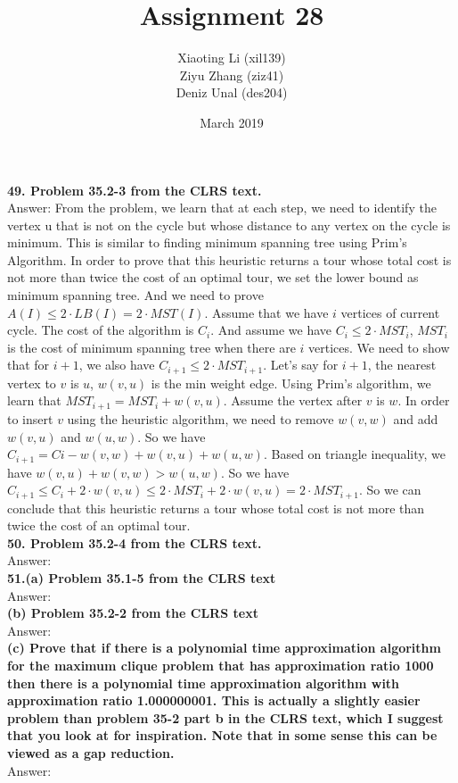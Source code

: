 \documentclass{article}
\title{Assignment 28}
\author{Xiaoting Li (xil139) \\
Ziyu Zhang (ziz41) \\
Deniz Unal (des204)}
\date{March 2019}
\begin{document}
\maketitle

\noindent
\textbf{49. Problem 35.2-3 from the CLRS text.} \\ \newline
Answer: From the problem, we learn that at each step, we need to  identify the vertex u that is not on the cycle but whose distance to any vertex on the cycle is minimum. This is similar to finding minimum spanning tree using Prim's Algorithm. In order to prove that this heuristic returns a tour whose total cost is not more than twice the cost of an optimal tour, we set the lower bound as minimum spanning tree. And we need to prove $A(I) \leq 2\cdot LB(I) = 2\cdot MST(I)$. Assume that we have $i$ vertices of current cycle. The cost of the algorithm is $C_{i}$. And assume we have $C_{i} \leq 2 \cdot MST_{i}$, $MST_{i}$ is the cost of minimum spanning tree when there are $i$ vertices. We need to show that for $i+1$, we also have $C_{i+1} \leq 2 \cdot MST_{i+1}$. Let's say for $i+1$, the nearest vertex to $v$ is $u$, $w(v, u)$ is the min weight edge. Using Prim's algorithm, we learn that $MST_{i+1} = MST_{i} + w(v, u)$. Assume the vertex after $v$ is $w$. In order to insert $v$ using the heuristic algorithm, we need to remove $w(v, w)$ and add $w(v, u)$ and $w(u, w)$. So we have $C_{i+1} = C{i} - w(v,w) + w(v, u) + w(u, w)$. Based on triangle inequality, we have $w(v, u) + w(v, w) > w(u, w)$. So we have $C_{i+1} \leq C_{i} + 2\cdot w(v,u) \leq 2\cdot MST_{i} + 2\cdot w(v,u) = 2\cdot MST_{i+1}$. So we can conclude that this heuristic returns a tour whose total cost is not more than twice the cost of an optimal tour.\\ \newline
\textbf{50. Problem 35.2-4 from the CLRS text.}\\ \newline
Answer: \\ \newline
\textbf{51.(a) Problem 35.1-5 from the CLRS text} \\ \newline
Answer: \\ \newline
\textbf{(b) Problem 35.2-2 from the CLRS text} \\ \newline
Answer: \\ \newline
\textbf{(c) Prove that if there is a polynomial time approximation algorithm for the maximum clique problem that has approximation ratio 1000 then there is a polynomial time approximation algorithm with approximation ratio 1.000000001. This is actually a slightly easier problem than problem 35-2 part b in the CLRS text, which I suggest that you look at for inspiration. Note that in some sense this can be viewed as a gap reduction.}\\ \newline
Answer: 
\end{document}
